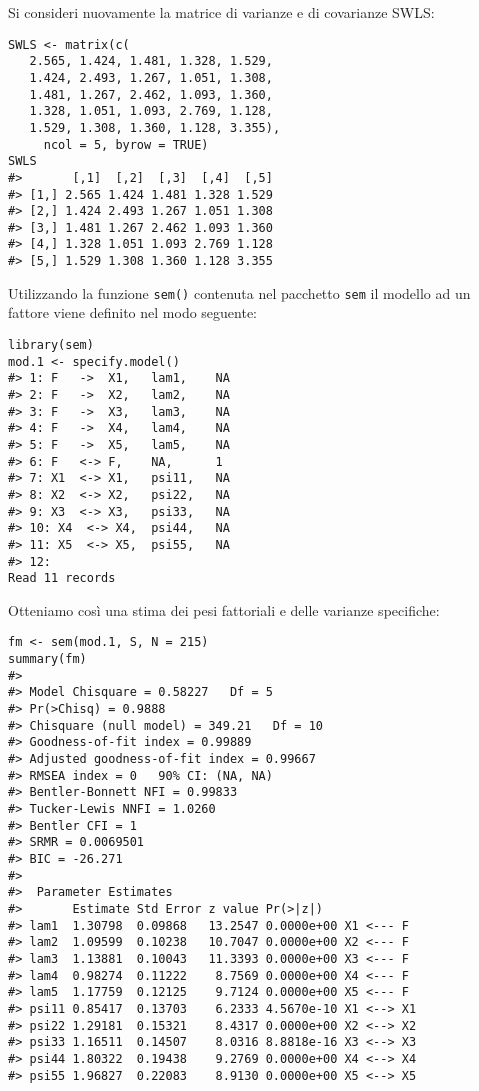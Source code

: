 \begin{exmp}

Si consideri nuovamente la matrice di varianze e di covarianze SWLS:

\begin{lstlisting}
SWLS <- matrix(c(
   2.565, 1.424, 1.481, 1.328, 1.529,
   1.424, 2.493, 1.267, 1.051, 1.308,
   1.481, 1.267, 2.462, 1.093, 1.360,
   1.328, 1.051, 1.093, 2.769, 1.128,
   1.529, 1.308, 1.360, 1.128, 3.355),
     ncol = 5, byrow = TRUE)
SWLS
#>       [,1]  [,2]  [,3]  [,4]  [,5]
#> [1,] 2.565 1.424 1.481 1.328 1.529
#> [2,] 1.424 2.493 1.267 1.051 1.308
#> [3,] 1.481 1.267 2.462 1.093 1.360
#> [4,] 1.328 1.051 1.093 2.769 1.128
#> [5,] 1.529 1.308 1.360 1.128 3.355
\end{lstlisting}
Utilizzando la  funzione {\tt sem()} contenuta nel pacchetto {\tt sem} il modello ad un fattore viene definito nel modo seguente:
\begin{lstlisting}
library(sem)
mod.1 <- specify.model() 
#> 1: F   ->  X1,   lam1,    NA
#> 2: F   ->  X2,   lam2,    NA
#> 3: F   ->  X3,   lam3,    NA
#> 4: F   ->  X4,   lam4,    NA
#> 5: F   ->  X5,   lam5,    NA
#> 6: F   <-> F,    NA,      1
#> 7: X1  <-> X1,   psi11,   NA
#> 8: X2  <-> X2,   psi22,   NA
#> 9: X3  <-> X3,   psi33,   NA
#> 10: X4  <-> X4,  psi44,   NA
#> 11: X5  <-> X5,  psi55,   NA
#> 12: 
Read 11 records
\end{lstlisting}
Otteniamo così una stima dei pesi fattoriali e delle varianze specifiche:
\begin{lstlisting}
fm <- sem(mod.1, S, N = 215) 
summary(fm)
#> 
#> Model Chisquare = 0.58227   Df = 5 
#> Pr(>Chisq) = 0.9888
#> Chisquare (null model) = 349.21   Df = 10
#> Goodness-of-fit index = 0.99889
#> Adjusted goodness-of-fit index = 0.99667
#> RMSEA index = 0   90% CI: (NA, NA)
#> Bentler-Bonnett NFI = 0.99833
#> Tucker-Lewis NNFI = 1.0260
#> Bentler CFI = 1
#> SRMR = 0.0069501
#> BIC = -26.271 
#> 
#>  Parameter Estimates
#>       Estimate Std Error z value Pr(>|z|)             
#> lam1  1.30798  0.09868   13.2547 0.0000e+00 X1 <--- F 
#> lam2  1.09599  0.10238   10.7047 0.0000e+00 X2 <--- F 
#> lam3  1.13881  0.10043   11.3393 0.0000e+00 X3 <--- F 
#> lam4  0.98274  0.11222    8.7569 0.0000e+00 X4 <--- F 
#> lam5  1.17759  0.12125    9.7124 0.0000e+00 X5 <--- F 
#> psi11 0.85417  0.13703    6.2333 4.5670e-10 X1 <--> X1
#> psi22 1.29181  0.15321    8.4317 0.0000e+00 X2 <--> X2
#> psi33 1.16511  0.14507    8.0316 8.8818e-16 X3 <--> X3
#> psi44 1.80322  0.19438    9.2769 0.0000e+00 X4 <--> X4
#> psi55 1.96827  0.22083    8.9130 0.0000e+00 X5 <--> X5

\end{lstlisting}
\end{exmp}
